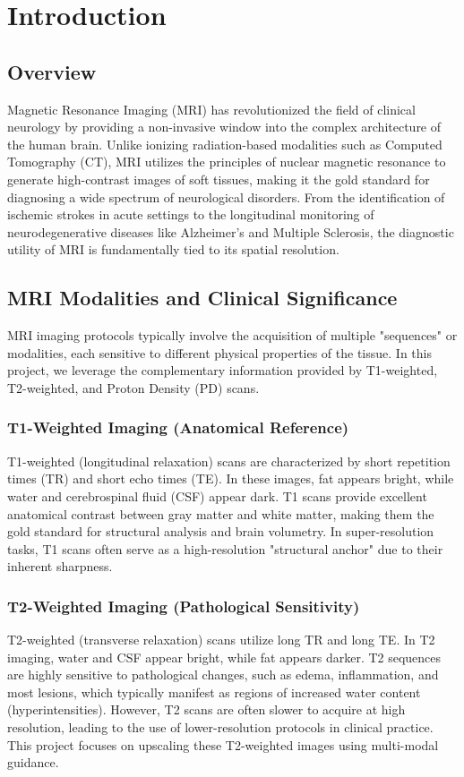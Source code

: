 \chapter{Introduction}

\section{Overview}
Magnetic Resonance Imaging (MRI) has revolutionized the field of clinical neurology by providing a non-invasive window into the complex architecture of the human brain. Unlike ionizing radiation-based modalities such as Computed Tomography (CT), MRI utilizes the principles of nuclear magnetic resonance to generate high-contrast images of soft tissues, making it the gold standard for diagnosing a wide spectrum of neurological disorders. From the identification of ischemic strokes in acute settings to the longitudinal monitoring of neurodegenerative diseases like Alzheimer's and Multiple Sclerosis, the diagnostic utility of MRI is fundamentally tied to its spatial resolution.

\section{MRI Modalities and Clinical Significance}
MRI imaging protocols typically involve the acquisition of multiple "sequences" or modalities, each sensitive to different physical properties of the tissue. In this project, we leverage the complementary information provided by T1-weighted, T2-weighted, and Proton Density (PD) scans.

\subsection{T1-Weighted Imaging (Anatomical Reference)}
T1-weighted (longitudinal relaxation) scans are characterized by short repetition times (TR) and short echo times (TE). In these images, fat appears bright, while water and cerebrospinal fluid (CSF) appear dark. T1 scans provide excellent anatomical contrast between gray matter and white matter, making them the gold standard for structural analysis and brain volumetry. In super-resolution tasks, T1 scans often serve as a high-resolution "structural anchor" due to their inherent sharpness.

\subsection{T2-Weighted Imaging (Pathological Sensitivity)}
T2-weighted (transverse relaxation) scans utilize long TR and long TE. In T2 imaging, water and CSF appear bright, while fat appears darker. T2 sequences are highly sensitive to pathological changes, such as edema, inflammation, and most lesions, which typically manifest as regions of increased water content (hyperintensities). However, T2 scans are often slower to acquire at high resolution, leading to the use of lower-resolution protocols in clinical practice. This project focuses on upscaling these T2-weighted images using multi-modal guidance.

